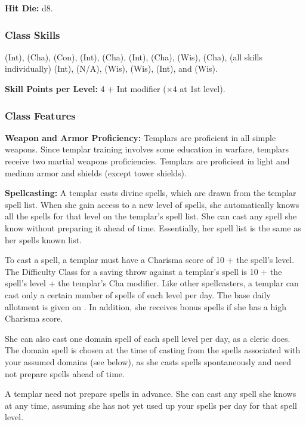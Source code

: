 \textbf{Hit Die:} d8.

\subsubsection{Class Skills}
 (Int),  (Cha),  (Con),  (Int),  (Cha),  (Int),  (Cha),  (Wis),  (Cha),  (all skills individually) (Int),  (N/A),  (Wis),  (Wis),  (Int), and  (Wis).

\textbf{Skill Points per Level:} 4 + Int modifier ($\times 4$ at 1st level).

\subsubsection{Class Features}

\textbf{Weapon and Armor Proficiency:} Templars are proficient in all simple weapons. Since templar training involves some education in warfare, templars receive two martial weapons proficiencies. Templars are proficient in light and medium armor and shields (except tower shields).

\textbf{Spellcasting:} A templar casts divine spells, which are drawn from the templar spell list. When she gain access to a new level of spells, she automatically knows all the spells for that level on the templar's spell list. She can cast any spell she know without preparing it ahead of time. Essentially, her spell list is the same as her spells known list.

To cast a spell, a templar must have a Charisma score of 10 + the spell's level. The Difficulty Class for a saving throw against a templar's spell is 10 + the spell's level + the templar's Cha modifier. Like other spellcasters, a templar can cast only a certain number of spells of each level per day. The base daily allotment is given on . In addition, she receives bonus spells if she has a high Charisma score.

She can also cast one domain spell of each spell level per day, as a cleric does. The domain spell is chosen at the time of casting from the spells associated with your assumed domains (see below), as she casts spells spontaneously and need not prepare spells ahead of time.

A templar need not prepare spells in advance. She can cast any spell she knows at any time, assuming she has not yet used up your spells per day for that spell level.

